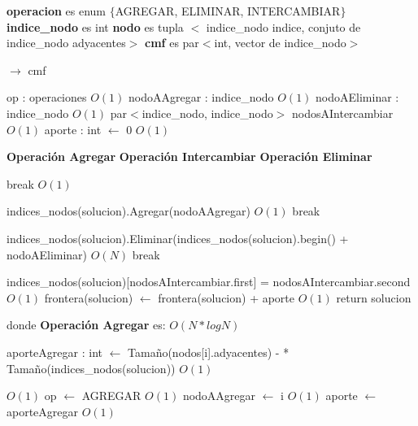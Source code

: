 \documentclass[a4paper, 10pt, twoside]{article}
\newenvironment{pseudo}[1][]{%
    \vspace{1em}%
    \begin{algorithmic}%
}
{%
    \end{algorithmic}%
    \vspace{1em}%
}
\newcommand{\Ode}[1]{\hfill $O(#1)$}
\begin{document}
\begin{pseudo}

\State \textbf{operacion} es enum $\lbrace$AGREGAR, ELIMINAR, INTERCAMBIAR$\rbrace$
\State \textbf{indice\_nodo} es int
\State \textbf{nodo} es tupla $<$ indice\_nodo indice, conjuto de indice\_nodo adyacentes$>$
\State \textbf{cmf} es par$<$int, vector de indice\_nodo$>$

\State
{} $\rightarrow$ cmf
	
	\State op : operaciones 																	\Ode{1}
	\State nodoAAgregar	: indice\_nodo 															\Ode{1}
	\State nodoAEliminar : indice\_nodo															\Ode{1}
	\State par$<$indice\_nodo, indice\_nodo$>$ nodosAIntercambiar								\Ode{1}
	\State aporte : int  $\leftarrow$ 0															\Ode{1}

	\State
	\State \textbf{Operación Agregar}
	\State
	\State \textbf{Operación Intercambiar}
	\State
	\State \textbf{Operación Eliminar}
	\State

	 break \EndIf																\Ode{1}

		    \State indices\_nodos(solucion).Agregar(nodoAAgregar)								\Ode{1}
		    \State break
	    \EndCase

		    \State indices\_nodos(solucion).Eliminar(indices\_nodos(solucion).begin() + nodoAEliminar)	\Ode{N}
		    \State break
	    \EndCase

		    \State indices\_nodos(solucion)[nodosAIntercambiar.first] = nodosAIntercambiar.second	\Ode{1}
	    \EndCase
	\EndSwitch
	\State
	\State frontera(solucion) $\leftarrow$ frontera(solucion) + aporte 							\Ode{1}
	\State return solucion

\EndProcedure
\State
\State donde \textbf{Operación Agregar} es:
\State
											\Ode{N*log N}

				\State aporteAgregar : int $\leftarrow$ Tamaño(nodos[i].adyacentes) -
				 * Tamaño(indices\_nodos(solucion))															\Ode{1}

																						\Ode{1}
					\State op $\leftarrow$ AGREGAR 																	\Ode{1}
					\State nodoAAgregar $\leftarrow$ i 																\Ode{1}
					\State aporte $\leftarrow$ aporteAgregar														\Ode{1}
				\EndIf
			\EndIf
		\EndFor


\end{pseudo}
\end{document}
